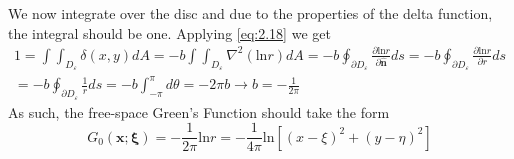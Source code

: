 \documentclass{article}
\newcommand{\pd}[2]{\frac{\partial #1}{\partial #2}}
\newcommand{\vb}[1]{\mathbf{ #1}}
\newcommand{\lap}{\nabla ^2}
\newcommand{\pull}{\! \! \!}
\newcommand{\dint}{\int \pull \int}
\newcommand{\fsgf}{G_0(\vb{x};\boldsymbol{\xi})}
\numberwithin{equation}{section}
\begin{document}
We now integrate over the disc and due to the properties of the delta function, the integral should be one. Applying \eqref{eq:2.18} we get 
\begin{equation}
\begin{split}
    1=\dint_{D_\varepsilon} \delta(x,y) dA = -b\dint_{D_\varepsilon} \lap (\text{ln}r) dA = -b\oint_{\partial D_\varepsilon} \pd{\text{ln}r}{\vb{\hat{n}}}ds = -b\oint_{\partial D_\varepsilon}\pd{\text{ln}r}{r} ds \\ = -b\oint_{\partial D_\varepsilon} \frac{1}{r} ds = -b\int^\pi_{-\pi} d\theta = -2\pi b \rightarrow b=-\frac{1}{2\pi}
\end{split}
\end{equation}
As such, the free-space Green's Function should take the form 
\begin{equation}
    \fsgf = -\frac{1}{2\pi}\text{ln}r = -\frac{1}{4\pi}\text{ln}[(x-\xi)^2+(y-\eta)^2]
\end{equation}
\end{document}
